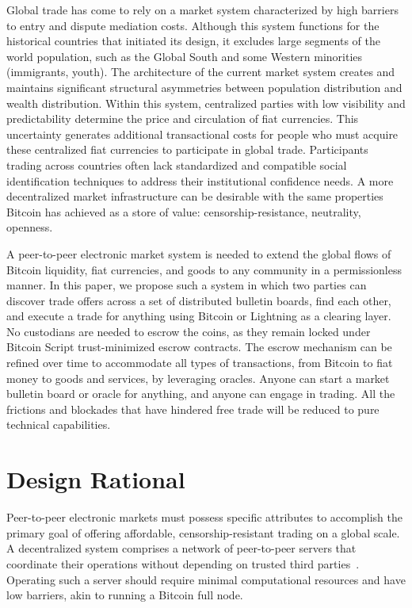 \documentclass[pdflatex,sn-mathphys]{sn-jnl}%
\theoremstyle{thmstyleone}%
\theoremstyle{thmstyletwo}%
\theoremstyle{thmstylethree}%
\begin{document}
Global trade has come to rely on a market system characterized by high barriers to entry and dispute mediation costs. Although this system functions for the historical  countries that initiated its design, it excludes large segments of the world population, such as the Global South and some Western minorities (immigrants, youth). The architecture of the current market system creates and maintains significant structural asymmetries between population distribution and wealth distribution. Within this system, centralized parties with low visibility and predictability determine the price and circulation of fiat currencies. This uncertainty generates additional transactional costs for people who must acquire these centralized fiat currencies to participate in global trade. Participants trading across countries often lack standardized and compatible social identification techniques to address their institutional confidence needs. A more decentralized market infrastructure can be desirable with the same properties Bitcoin has achieved as a store of value: censorship-resistance, neutrality, openness.   

A peer-to-peer electronic market system is needed to extend the global flows of Bitcoin liquidity, fiat currencies, and goods to any community in a permissionless manner. In this paper, we propose such a system in which two parties can discover trade offers across a set of distributed bulletin boards, find each other, and execute a trade for anything using Bitcoin or Lightning as a clearing layer. No custodians are needed to escrow the coins, as they remain locked under Bitcoin Script trust-minimized escrow contracts. The escrow mechanism can be refined over time to accommodate all types of transactions, from Bitcoin to fiat money to goods and services, by leveraging oracles. Anyone can start a market bulletin board or oracle for anything, and anyone can engage in trading. All the frictions and blockades that have hindered free trade will be reduced to pure technical capabilities.

\section{Design Rational}

Peer-to-peer electronic markets must possess specific attributes to accomplish the primary goal of offering affordable, censorship-resistant trading on a global scale. A decentralized system comprises a network of peer-to-peer servers that coordinate their operations without depending on trusted third parties~\cite{Holes2001Szabo}. Operating such a server should require minimal computational resources and have low barriers, akin to running a Bitcoin full node.
\end{document}
